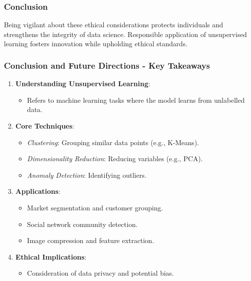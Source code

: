 \documentclass[aspectratio=169]{beamer}
\begin{document}
\begin{frame}[fragile]
  \frametitle{Conclusion}
  Being vigilant about these ethical considerations protects individuals and strengthens the integrity of data science. 
  Responsible application of unsupervised learning fosters innovation while upholding ethical standards.
\end{frame}

\begin{frame}[fragile]
    \frametitle{Conclusion and Future Directions - Key Takeaways}
    \begin{enumerate}
        \item \textbf{Understanding Unsupervised Learning}:
        \begin{itemize}
            \item Refers to machine learning tasks where the model learns from unlabelled data.
        \end{itemize}
        
        \item \textbf{Core Techniques}:
        \begin{itemize}
            \item \textit{Clustering}: Grouping similar data points (e.g., K-Means).
            \item \textit{Dimensionality Reduction}: Reducing variables (e.g., PCA).
            \item \textit{Anomaly Detection}: Identifying outliers.
        \end{itemize}
        
        \item \textbf{Applications}:
        \begin{itemize}
            \item Market segmentation and customer grouping.
            \item Social network community detection.
            \item Image compression and feature extraction.
        \end{itemize}

        \item \textbf{Ethical Implications}:
        \begin{itemize}
            \item Consideration of data privacy and potential bias.
        \end{itemize}
    \end{enumerate}
\end{frame}
\end{document}

